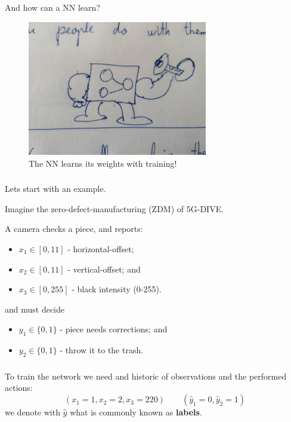\documentclass{beamer}
\begin{document}
\begin{frame}
    \frametitle{\insertsection}
    \framesubtitle{\insertsubsection}

    And how can a NN learn?
    \begin{figure}
        \centering
        \includegraphics[width=0.7\textwidth]{img/trained-nn.jpg}
        \caption{The NN learns its weights with training!}
        \label{fig:trained-nn-2}
    \end{figure}
\end{frame}



\begin{frame}
    \frametitle{\insertsection}
    \framesubtitle{\insertsubsection}

    Lets start with an example.

    Imagine the zero-defect-manufacturing (ZDM) of 5G-DIVE.

    A camera checks a piece, and reports:
    \begin{itemize}
        \item $x_1\in[0,11]$ - horizontal-offset;
        \item $x_2\in[0,11]$ - vertical-offset; and
        \item $x_3\in[0,255]$ - black intensity (0-255).
    \end{itemize}
    and must decide
    \begin{itemize}
        \item $y_1\in\{0,1\}$ - piece needs corrections; and
        \item $y_2\in\{0,1\}$ - throw it to the trash.
    \end{itemize}
\end{frame}



\begin{frame}
    \frametitle{\insertsection}
    \framesubtitle{\insertsubsection}

    To train the network we need and historic of observations and the performed actions:
    \begin{equation*}
        (x_1=1,x_2=2,x_3=220)\qquad (\hat{y}_1=0,\hat{y}_2=1)
    \end{equation*}
    we denote with $\hat{y}$ what is commonly known as \textbf{labels}.
\end{frame}
\end{document}
